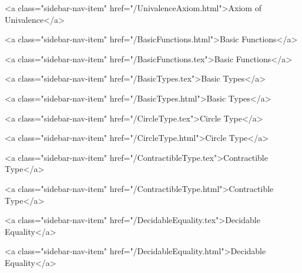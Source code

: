           <a class="sidebar-nav-item" href="/UnivalenceAxiom.html">Axiom of Univalence</a>
        
      
    
      
        
          <a class="sidebar-nav-item" href="/BasicFunctions.html">Basic Functions</a>
        
      
    
      
        
          <a class="sidebar-nav-item" href="/BasicFunctions.tex">Basic Functions</a>
        
      
    
      
        
          <a class="sidebar-nav-item" href="/BasicTypes.tex">Basic Types</a>
        
      
    
      
        
          <a class="sidebar-nav-item" href="/BasicTypes.html">Basic Types</a>
        
      
    
      
        
          <a class="sidebar-nav-item" href="/CircleType.tex">Circle Type</a>
        
      
    
      
        
          <a class="sidebar-nav-item" href="/CircleType.html">Circle Type</a>
        
      
    
      
        
          <a class="sidebar-nav-item" href="/ContractibleType.tex">Contractible Type</a>
        
      
    
      
        
          <a class="sidebar-nav-item" href="/ContractibleType.html">Contractible Type</a>
        
      
    
      
        
          <a class="sidebar-nav-item" href="/DecidableEquality.tex">Decidable Equality</a>
        
      
    
      
        
          <a class="sidebar-nav-item" href="/DecidableEquality.html">Decidable Equality</a>
        
      
    
